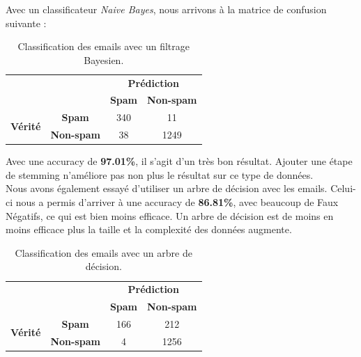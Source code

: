 \documentclass[a4paper]{article}
\begin{document}
Avec un classificateur \textit{Naive Bayes}, nous arrivons à la matrice de confusion suivante :

\begin{table}[H]
	\centering
	\def\arraystretch{2.0}
	\begin{tabular}{cccl}
															  & \textbf{}                              & \multicolumn{2}{c}{\textbf{Prédiction}}                                          \\ \cline{3-4} 
															  & \multicolumn{1}{c|}{}                  & \multicolumn{1}{c|}{\textbf{Spam}}      & \multicolumn{1}{c|}{\textbf{Non-spam}} \\ \cline{2-4} 
		\multicolumn{1}{c|}{\multirow{2}{*}{\textbf{Vérité}}} & \multicolumn{1}{c|}{\textbf{Spam}}     & \multicolumn{1}{c|}{340}                & \multicolumn{1}{c|}{11}                \\ \cline{2-4} 
		\multicolumn{1}{c|}{}                                 & \multicolumn{1}{c|}{\textbf{Non-spam}} & \multicolumn{1}{c|}{38}                 & \multicolumn{1}{c|}{1249}              \\ \cline{2-4} 
	\end{tabular}
	\caption{Classification des emails avec un filtrage Bayesien.}
\end{table}

Avec une accuracy de \textbf{97.01\%}, il s'agit d'un très bon résultat.
Ajouter une étape de stemming n'améliore pas non plus le résultat sur ce type de données.
\\

Nous avons également essayé d'utiliser un arbre de décision avec les emails.
Celui-ci nous a permis d'arriver à une accuracy de \textbf{86.81\%}, avec beaucoup de Faux Négatifs, ce qui est bien moins efficace.
Un arbre de décision est de moins en moins efficace plus la taille et la complexité des données augmente.

\begin{table}[H]
	\centering
	\def\arraystretch{2.0}
	\begin{tabular}{cccl}
															  & \textbf{}                              & \multicolumn{2}{c}{\textbf{Prédiction}}                                          \\ \cline{3-4} 
															  & \multicolumn{1}{c|}{}                  & \multicolumn{1}{c|}{\textbf{Spam}}      & \multicolumn{1}{c|}{\textbf{Non-spam}} \\ \cline{2-4} 
		\multicolumn{1}{c|}{\multirow{2}{*}{\textbf{Vérité}}} & \multicolumn{1}{c|}{\textbf{Spam}}     & \multicolumn{1}{c|}{166}                & \multicolumn{1}{c|}{212}               \\ \cline{2-4} 
		\multicolumn{1}{c|}{}                                 & \multicolumn{1}{c|}{\textbf{Non-spam}} & \multicolumn{1}{c|}{4}                  & \multicolumn{1}{c|}{1256}              \\ \cline{2-4} 
	\end{tabular}
	\caption{Classification des emails avec un arbre de décision.}
\end{table}
\end{document}
